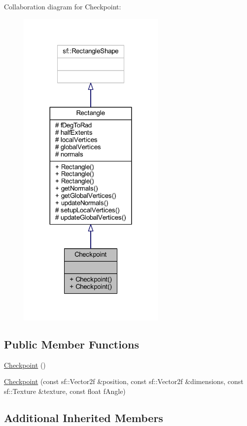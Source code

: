 Collaboration diagram for Checkpoint\+:\nopagebreak
\begin{figure}[H]
\begin{center}
\leavevmode
\includegraphics[width=204pt]{class_checkpoint__coll__graph}
\end{center}
\end{figure}
\subsection*{Public Member Functions}
\begin{DoxyCompactItemize}
\item 
\hyperlink{class_checkpoint_a7583dda24f192e944ebbfaad7efe4d5b}{Checkpoint} ()
\item 
\hyperlink{class_checkpoint_a27cd3de8d0680d688ed539d54bcefaf3}{Checkpoint} (const sf\+::\+Vector2f \&position, const sf\+::\+Vector2f \&dimensions, const sf\+::\+Texture \&texture, const float f\+Angle)
\end{DoxyCompactItemize}
\subsection*{Additional Inherited Members}


